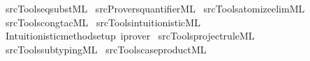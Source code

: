 \begin{isabellebody}
\isamarkupfalse%
\ {\isacartoucheopen}{\isachartilde}{\kern0pt}{\isachartilde}{\kern0pt}{\isacharslash}{\kern0pt}src{\isacharslash}{\kern0pt}Tools{\isacharslash}{\kern0pt}eqsubst{\isachardot}{\kern0pt}ML{\isacartoucheclose}\isanewline
{}\isamarkupfalse%
\ {\isacartoucheopen}{\isachartilde}{\kern0pt}{\isachartilde}{\kern0pt}{\isacharslash}{\kern0pt}src{\isacharslash}{\kern0pt}Provers{\isacharslash}{\kern0pt}quantifier{}{\isachardot}{\kern0pt}ML{\isacartoucheclose}\isanewline
{}\isamarkupfalse%
\ {\isacartoucheopen}{\isachartilde}{\kern0pt}{\isachartilde}{\kern0pt}{\isacharslash}{\kern0pt}src{\isacharslash}{\kern0pt}Tools{\isacharslash}{\kern0pt}atomize{\isacharunderscore}{\kern0pt}elim{\isachardot}{\kern0pt}ML{\isacartoucheclose}\isanewline
{}\isamarkupfalse%
\ {\isacartoucheopen}{\isachartilde}{\kern0pt}{\isachartilde}{\kern0pt}{\isacharslash}{\kern0pt}src{\isacharslash}{\kern0pt}Tools{\isacharslash}{\kern0pt}cong{\isacharunderscore}{\kern0pt}tac{\isachardot}{\kern0pt}ML{\isacartoucheclose}\isanewline
{}\isamarkupfalse%
\ {\isacartoucheopen}{\isachartilde}{\kern0pt}{\isachartilde}{\kern0pt}{\isacharslash}{\kern0pt}src{\isacharslash}{\kern0pt}Tools{\isacharslash}{\kern0pt}intuitionistic{\isachardot}{\kern0pt}ML{\isacartoucheclose}\ \isamarkupfalse%
\ {\isacartoucheopen}Intuitionistic{\isachardot}{\kern0pt}method{\isacharunderscore}{\kern0pt}setup\ \isactrlbinding {\isasymopen}iprover{\isasymclose}{\isacartoucheclose}\isanewline
{}\isamarkupfalse%
\ {\isacartoucheopen}{\isachartilde}{\kern0pt}{\isachartilde}{\kern0pt}{\isacharslash}{\kern0pt}src{\isacharslash}{\kern0pt}Tools{\isacharslash}{\kern0pt}project{\isacharunderscore}{\kern0pt}rule{\isachardot}{\kern0pt}ML{\isacartoucheclose}\isanewline
{}\isamarkupfalse%
\ {\isacartoucheopen}{\isachartilde}{\kern0pt}{\isachartilde}{\kern0pt}{\isacharslash}{\kern0pt}src{\isacharslash}{\kern0pt}Tools{\isacharslash}{\kern0pt}subtyping{\isachardot}{\kern0pt}ML{\isacartoucheclose}\isanewline
{}\isamarkupfalse%
\ {\isacartoucheopen}{\isachartilde}{\kern0pt}{\isachartilde}{\kern0pt}{\isacharslash}{\kern0pt}src{\isacharslash}{\kern0pt}Tools{\isacharslash}{\kern0pt}case{\isacharunderscore}{\kern0pt}product{\isachardot}{\kern0pt}ML{\isacartoucheclose}\isanewline

\end{isabellebody}
